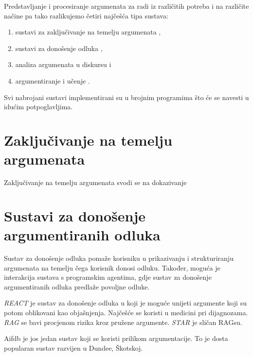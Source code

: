 Predstavljanje i procesiranje argumenata za radi iz različitih potreba i na
različite načine pa tako razlikujemo četiri najčešća tipa sustava:

\begin{enumerate} 
    \item sustavi za zaključivanje na temelju argumenata
    , 
    \item sustavi za donošenje
    odluka , 
    \item analiza argumenata u diskursu  i 
    \item argumentiranje i učenje .  
\end{enumerate}

Svi nabrojani sustavi implementirani su u brojnim programima što će se navesti
u idućim potpoglavljima.


\section{Zaključivanje na temelju argumenata}

Zaključivanje na temelju argumenata svodi se na dokazivanje 

\section{Sustavi za donošenje argumentiranih odluka}

Sustav za donošenje odluka pomaže korisniku u prikazivanju i strukturiranju
argumenata na temelju čega korisnik donosi odluku. Također, moguća je
interakcija sustava s programskim agentima, gdje sustav za donošenje
argumentiranih odluka predlaže povoljne odluke.

\emph{REACT} je sustav za donošenje odluka u koji je moguće unijeti argumente
koji su potom oblikovani kao objašnjenja. Najčešće se koristi u medicini pri
dijagnozama. \emph{RAG} se bavi procjenom rizika  kroz
pružene argumente. \emph{STAR} je sličan RAGsu. 

Aifdb je jos jedan sustav koji se koristi prilikom argumentacije. 
To je dosta popularan sustav razvijen u Dundee, Škotskoj. 
